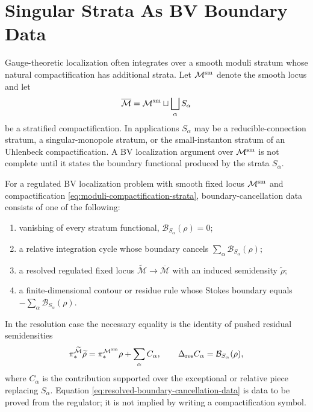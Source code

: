 \section{Singular Strata As BV Boundary Data}
\label{sec:bv-singular-strata-boundary-data}

Gauge-theoretic localization often integrates over a smooth moduli stratum
whose natural compactification has additional strata.  Let
\(\mathcal M^{\rm sm}\) denote the smooth locus and let
\begin{equation}
  \overline{\mathcal M}
  =
  \mathcal M^{\rm sm}\sqcup\bigsqcup_\alpha S_\alpha
  \label{eq:moduli-compactification-strata}
\end{equation}
be a stratified compactification.  In applications \(S_\alpha\) may be a
reducible-connection stratum, a singular-monopole stratum, or the
small-instanton stratum of an Uhlenbeck compactification.  A BV localization
argument over \(\mathcal M^{\rm sm}\) is not complete until it states the
boundary functional produced by the strata \(S_\alpha\).

\begin{definition}
\label{def:boundary-cancellation-data}
For a regulated BV localization problem with smooth fixed locus
\(\mathcal M^{\rm sm}\) and compactification
\eqref{eq:moduli-compactification-strata}, boundary-cancellation data
consists of one of the following:
\begin{enumerate}
  \item vanishing of every stratum functional,
  \(\mathcal B_{S_\alpha}(\rho)=0\);
  \item a relative integration cycle whose boundary cancels
  \(\sum_\alpha\mathcal B_{S_\alpha}(\rho)\);
  \item a resolved regulated fixed locus
  \(\widetilde{\mathcal M}\to\overline{\mathcal M}\) with an induced
  semidensity \(\widetilde\rho\);
  \item a finite-dimensional contour or residue rule whose Stokes boundary
  equals \(-\sum_\alpha\mathcal B_{S_\alpha}(\rho)\).
\end{enumerate}
In the resolution case the necessary equality is the identity of pushed
residual semidensities
\begin{equation}
  \pi_*^{\widetilde{\mathcal M}}\widetilde\rho
  =
  \pi_*^{\mathcal M^{\rm sm}}\rho
  +
  \sum_\alpha C_\alpha,
  \qquad
  \Delta_{\rm res} C_\alpha
  =
  \mathcal B_{S_\alpha}(\rho),
  \label{eq:resolved-boundary-cancellation-data}
\end{equation}
where \(C_\alpha\) is the contribution supported over the exceptional or
relative piece replacing \(S_\alpha\).  Equation
\eqref{eq:resolved-boundary-cancellation-data} is data to be proved from
the regulator; it is not implied by writing a compactification symbol.
\end{definition}


